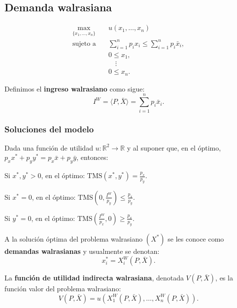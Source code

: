 \documentclass[8pt,a4paper]{extarticle}
\begin{document}
\begin{multicols}{3}
\newpage

\section{Demanda walrasiana}

\begin{equation*}
\begin{aligned}
	\max_{\{x_1, \ldots, x_n\}}\	  & u(x_1, \ldots, x_n) \\
	\text{sujeto a} \quad & \sum_{i=1}^{n} p_i x_i \le \sum_{i=1}^{n} p_i \bar{x}_i, \\
						  & 0 \le x_1, \\
						  & \quad \vdots \\
						  & 0 \le x_n.
\end{aligned}
\end{equation*}

\begin{boxdef}
	Definimos el \textbf{ingreso walrasiano} como sigue:
	\[
		I^W = \langle P, \bar{X} \rangle = \sum_{i=1}^n p_i \bar{x}_i
	.\] 
\end{boxdef}

\subsubsection*{Soluciones del modelo}

Dada una función de utilidad $u : \mathbb{R}^2 \to \mathbb{R}$ y al suponer que, en el óptimo, $p_x x^* + p_y y^* = p_x \bar{x} + p_y \bar{y}$, entonces:

\begin{bulletlist}
\item Si $x^*, y^* > 0$, en el óptimo: $\displaystyle \text{TMS} (x^*, y^*) = \frac{p_x}{p_y}$.
\item Si $x^* = 0$, en el óptimo: $\displaystyle \text{TMS} \left(0, \frac{I^W}{p_y}\right) \le \frac{p_x}{p_y}$.
\item Si $y^* = 0$, en el óptimo: $\displaystyle \text{TMS} \left(\frac{I^W}{p_x}, 0\right) \ge \frac{p_x}{p_y}$.
\end{bulletlist}

\begin{boxdef}
A la solución óptima del problema walrasiano $(X^*)$ se les conoce como \textbf{demandas walrasianas} y usualmente se denotan:
\[
	x_i^* = X_i^W (P, \bar{X})
.\] 
\end{boxdef}

\begin{boxdef}
	La \textbf{función de utilidad indirecta walrasiana}, denotada $V(P, \bar{X})$, es la función valor del problema walrasiano:
	\[
		V(P, \bar{X}) = u(X_1^W(P, \bar{X}), \ldots, X_n^W(P, \bar{X}))
	.\] 
\end{boxdef}


\end{multicols}
\end{document}
